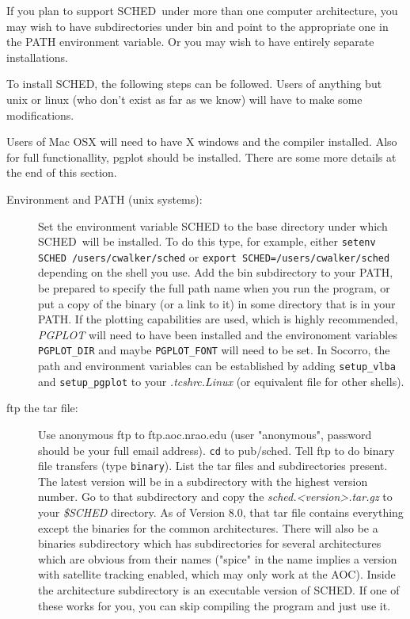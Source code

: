 \documentclass{report}
\newcommand{\sched}{{\sc SCHED}}
\newcommand{\schedb}{{\sc SCHED~}}
\begin{document}
If you plan to support \schedb under more than one computer
architecture, you may wish to have subdirectories under bin and point
to the appropriate one in the PATH environment variable.  Or you may
wish to have entirely separate installations.

To install \sched, the following steps can be followed.  Users of
anything but unix or linux (who don't exist as far as we know) will
have to make some modifications.

Users of Mac OSX will need to have X windows and the compiler installed.
Also for full functionallity, pgplot should be installed.  There are some
more details at the end of this section.

\begin{description}

\item [Environment and PATH (unix systems):] Set the environment
variable SCHED to the base directory under which \schedb will be
installed.  To do this type, for example, either {\tt setenv SCHED 
/users/cwalker/sched} or {\tt export SCHED=/users/cwalker/sched}
depending on the
shell you use.  Add the bin subdirectory to your PATH, be prepared to
specify the full path name when you run the program, or put a copy of
the binary (or a link to it) in some directory that is in your PATH.
If the plotting capabilities are used, which is highly recommended,
{\sl PGPLOT} will need to have been installed and the environoment
variables {\tt PGPLOT\_DIR} and maybe {\tt PGPLOT\_FONT} will need to be
set.  In Socorro, the path and environment variables can be
established by adding {\tt setup\_vlba} and {\tt setup\_pgplot} to your
{\sl .tcshrc.Linux} (or equivalent file for other shells).

\item [ftp the tar file:] Use anonymous ftp to ftp.aoc.nrao.edu (user
"anonymous", password should be your full email address).  {\tt cd} to
pub/sched.  Tell ftp to do binary file transfers (type {\tt binary}).
List the tar files and subdirectories present.  The latest version
will be in a subdirectory with the highest version number.  Go to that
subdirectory and copy the {\sl sched.<version>.tar.gz} to your {\sl
\$SCHED} directory.  As of Version 8.0, that tar file contains
everything except the binaries for the common architectures. There
will also be a binaries subdirectory which has subdirectories for
several architectures which are obvious from their names ("spice" in
the name implies a version with satellite tracking enabled, which may
only work at the AOC).  Inside the architecture subdirectory is an
executable version of \sched.  If one of these works for you, you can
skip compiling the program and just use it.


\end{description}
\end{document}
